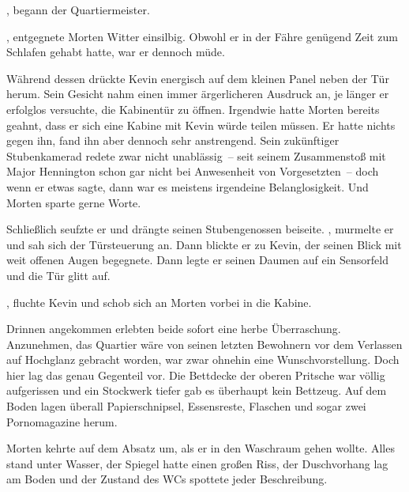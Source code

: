 , begann der Quartiermeister.

\par

, entgegnete Morten Witter einsilbig.
Obwohl er in der Fähre genügend Zeit zum Schlafen gehabt hatte, war er dennoch müde.

\par

Während dessen drückte Kevin energisch auf dem kleinen Panel neben der Tür herum.
Sein Gesicht nahm einen immer ärgerlicheren Ausdruck an, je länger er erfolglos versuchte, die Kabinentür zu öffnen.
Irgendwie hatte Morten bereits geahnt, dass er sich eine Kabine mit Kevin würde teilen müssen.
Er hatte nichts gegen ihn, fand ihn aber dennoch sehr anstrengend.
Sein zukünftiger Stubenkamerad redete zwar nicht unablässig~-- seit seinem Zusammenstoß mit Major Hennington schon gar nicht bei Anwesenheit von Vorgesetzten~-- doch wenn er etwas sagte, dann war es meistens irgendeine Belanglosigkeit.
Und Morten sparte gerne Worte.

\par

Schließlich seufzte er und drängte seinen Stubengenossen beiseite.
, murmelte er und sah sich der Türsteuerung an.
Dann blickte er zu Kevin, der seinen Blick mit weit offenen Augen begegnete.
Dann legte er seinen Daumen auf ein Sensorfeld und die Tür glitt auf.

\par

, fluchte Kevin und schob sich an Morten vorbei in die Kabine.

\par

Drinnen angekommen erlebten beide sofort eine herbe Überraschung.
Anzunehmen, das Quartier wäre von seinen letzten Bewohnern vor dem Verlassen auf Hochglanz gebracht worden, war zwar ohnehin eine Wunschvorstellung.
Doch hier lag das genau Gegenteil vor.
Die Bettdecke der oberen Pritsche war völlig aufgerissen und ein Stockwerk tiefer gab es überhaupt kein Bettzeug.
Auf dem Boden lagen überall Papierschnipsel, Essensreste, Flaschen und sogar zwei Pornomagazine herum.

\par

Morten kehrte auf dem Absatz um, als er in den Waschraum gehen wollte.
Alles stand unter Wasser, der Spiegel hatte einen großen Riss, der Duschvorhang lag am Boden und der Zustand des WCs spottete jeder Beschreibung.

